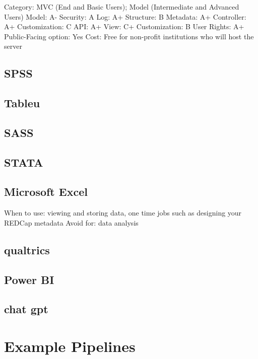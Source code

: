 \documentclass[
]{book}
\begin{document}
Category: MVC (End and Basic Users); Model (Intermediate and Advanced Users)
Model: A-
Security: A
Log: A+
Structure: B
Metadata: A+
Controller: A+
Customization: C
API: A+
View: C+
Customization: B
User Rights: A+
Public-Facing option: Yes
Cost: Free for non-profit institutions who will host the server

\section{SPSS}\label{spss}

\section{Tableu}\label{tableu}

\section{SASS}\label{sass}

\section{STATA}\label{stata}

\section{Microsoft Excel}\label{microsoft-excel}

When to use: viewing and storing data, one time jobs such as designing your REDCap metadata
Avoid for: data analysis

\section{qualtrics}\label{qualtrics-1}

\section{Power BI}\label{power-bi}

\section{chat gpt}\label{chat-gpt}

\chapter{Example Pipelines}\label{example-pipelines}
\end{document}
